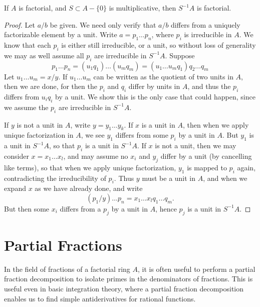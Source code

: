 \begin{theorem}
    If $A$ is factorial, and $S \subset A - \{ 0 \}$ is multiplicative, then $S^{-1}A$ is factorial.
\end{theorem}
\begin{proof}
    Let $a/b$ be given. We need only verify that $a/b$ differs from a uniquely factorizable element by a unit. Write $a = p_1 \dots p_n$, where $p_i$ is irreducible in $A$. We know that each $p_i$ is either still irreducible, or a unit, so without loss of generality we may as well assume all $p_i$ are irreducible in $S^{-1}A$. Suppose
    \[ p_1 \dots p_n = (u_1 q_1) \dots (u_m q_m) = (u_1 \dots u_m q_1) q_2 \dots q_m \]
    Let $u_1 \dots u_m = x/y$. If $u_1 \dots u_m$ can be written as the quotient of two units in $A$, then we are done, for then the $p_i$ and $q_i$ differ by units in $A$, and thus the $p_i$ differs from $u_i q_i$ by a unit. We show this is the only case that could happen, since we assume the $p_i$ are irreducible in $S^{-1}A$.

    If $y$ is not a unit in $A$, write $y = y_1 \dots y_k$. If $x$ is a unit in $A$, then when we apply unique factorization in $A$, we see $y_1$ differs from some $p_i$ by a unit in $A$. But $y_1$ is a unit in $S^{-1}A$, so that $p_i$ is a unit in $S^{-1}A$. If $x$ is not a unit, then we may consider $x = x_1 \dots x_{l}$, and may assume no $x_i$ and $y_j$ differ by a unit (by cancelling like terms), so that when we apply unique factorization, $y_1$ is mapped to $p_i$ again, contradicting the irreducibility of $p_i$. Thus $y$ must be a unit in $A$, and when we expand $x$ as we have already done, and write
    \[ (p_1/y) \dots p_n = x_1 \dots x_{l} q_1 \dots q_m. \]
    But then some $x_i$ differs from a $p_j$ by a unit in $A$, hence $p_j$ is a unit in $S^{-1}A$.
\end{proof}

\section{Partial Fractions}

In the field of fractions of a factorial ring $A$, it is often useful to perform a partial fraction decomposition to isolate primes in the denominators of fractions. This is useful even in basic integration theory, where a partial fraction decomposition enables us to find simple antiderivatives for rational functions.

